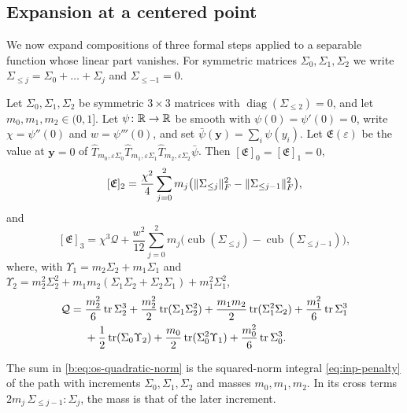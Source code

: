 \subsection{Expansion at a centered point}

We now expand compositions of three formal steps applied to a separable function
whose linear part vanishes. For symmetric matrices $\Sigma_0,\Sigma_1,\Sigma_2$
we write $\Sigma_{\le j}=\Sigma_0+\dots+\Sigma_j$ and $\Sigma_{\le-1}=0$.

\begin{lemma}\label{lem:cub-centered}
Let $\Sigma_0,\Sigma_1,\Sigma_2$ be symmetric $3\times3$ matrices with
$\operatorname{diag}(\Sigma_{\le2})=0$, and let $m_0,m_1,m_2\in(0,1]$. Let
$\psi\colon\mathbb R\to\mathbb R$ be smooth with $\psi(0)=\psi'(0)=0$, write
$\chi=\psi''(0)$ and $w=\psi'''(0)$, and set $\bar\psi(\mathbf y)=\sum_i\psi(y_i)$. Let
$\mathfrak E(\varepsilon)$ be the value at $\mathbf y=0$ of
$\widehat T_{m_0,\varepsilon\Sigma_0}\widehat T_{m_1,\varepsilon\Sigma_1}\widehat
T_{m_2,\varepsilon\Sigma_2}\bar\psi$. Then $[\mathfrak E]_0=[\mathfrak E]_1=0$,
\begin{equation}\label{b:eq:os-quadratic-norm}
 [\mathfrak E]_2=\frac{\chi^2}4\sum_{j=0}^2m_j\bigl(\lVert \Sigma_{\le j}\rVert_F^2
 -\lVert \Sigma_{\le j-1}\rVert_F^2\bigr),
\end{equation}
and
\begin{equation}\label{eq:cub-third}
 [\mathfrak E]_3=\chi^3\mathcal Q
 +\frac{w^2}{12}\sum_{j=0}^2m_j\bigl(\operatorname{cub}(\Sigma_{\le j})
 -\operatorname{cub}(\Sigma_{\le j-1})\bigr),
\end{equation}
where, with $\Upsilon_1=m_2\Sigma_2+m_1\Sigma_1$ and
$\Upsilon_2=m_2^2\Sigma_2^2+m_1m_2(\Sigma_1\Sigma_2+\Sigma_2\Sigma_1)+m_1^2\Sigma_1^2$,
\[
\begin{aligned}
 \mathcal Q={}&\frac{m_2^2}6\operatorname{tr}\Sigma_2^3+\frac{m_2^2}2\operatorname{tr}(\Sigma_1\Sigma_2^2)
 +\frac{m_1m_2}2\operatorname{tr}(\Sigma_1^2\Sigma_2)+\frac{m_1^2}6\operatorname{tr}\Sigma_1^3\\
 &+\frac12\operatorname{tr}(\Sigma_0\Upsilon_2)+\frac{m_0}2\operatorname{tr}(\Sigma_0^2\Upsilon_1)+\frac{m_0^2}6\operatorname{tr}\Sigma_0^3.
\end{aligned}
\]
\end{lemma}

The sum in \eqref{b:eq:os-quadratic-norm} is the squared-norm integral
\eqref{eq:inp-penalty} of the path with increments $\Sigma_0,\Sigma_1,\Sigma_2$
and masses $m_0,m_1,m_2$. In its cross terms
$2m_j\,\Sigma_{\le j-1}\mathbin:\Sigma_j$, the mass is that of the later
increment.

